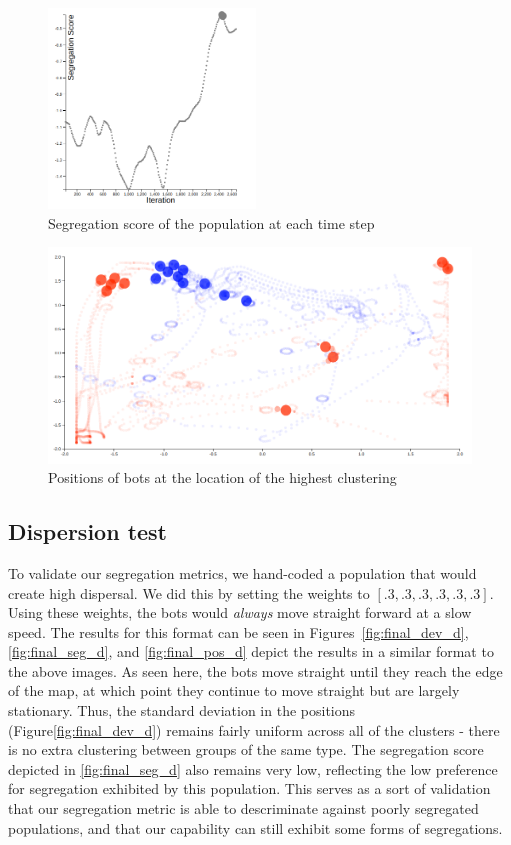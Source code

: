 \begin{figure}
    \centering
    \includegraphics[width=5.5cm]{imgs/final_seg_1.png}
    \caption{Segregation score of the population at each time step}
    \label{fig:final_seg_1}
\end{figure}

\begin{figure}
    \centering
    \includegraphics[width=\linewidth]{imgs/final_place_1.png}
    \caption{Positions of bots at the location of the highest clustering}
    \label{fig:final_pos_1}
\end{figure}

\subsection{Dispersion test}
\label{sec:dispersion}

To validate our segregation metrics, we hand-coded a population that would create high dispersal. 
We did this by setting the weights to $[.3, .3, .3, .3, .3, .3]$.
Using these weights, the bots would \emph{always} move straight forward at a slow speed.
The results for this format can be seen in Figures~\ref{fig:final_dev_d}, \ref{fig:final_seg_d}, and \ref{fig:final_pos_d} depict the results in a similar format to the above images. 
As seen here, the bots move straight until they reach the edge of the map, at which point they continue to move straight but are largely stationary. 
Thus, the standard deviation in the positions (Figure\ref{fig:final_dev_d}) remains fairly uniform across all of the clusters - there is no extra clustering between groups of the same type. 
The segregation score depicted in \ref{fig:final_seg_d} also remains very low, reflecting the low preference for segregation exhibited by this population.
This serves as a sort of validation that our segregation metric is able to descriminate against poorly segregated populations, and that our capability can still exhibit some forms of segregations.

